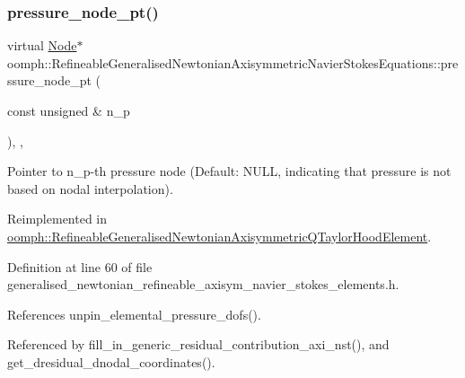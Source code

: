 \subsubsection{\texorpdfstring{pressure\+\_\+node\+\_\+pt()}{pressure\_node\_pt()}}
{\footnotesize\ttfamily virtual \hyperlink{classoomph_1_1Node}{Node}$\ast$ oomph\+::\+Refineable\+Generalised\+Newtonian\+Axisymmetric\+Navier\+Stokes\+Equations\+::pressure\+\_\+node\+\_\+pt (\begin{DoxyParamCaption}\item[{const unsigned \&}]{n\+\_\+p }\end{DoxyParamCaption})\hspace{0.3cm}{\ttfamily [inline]}, {\ttfamily [protected]}, {\ttfamily [virtual]}}



Pointer to n\+\_\+p-\/th pressure node (Default\+: N\+U\+LL, indicating that pressure is not based on nodal interpolation). 



Reimplemented in \hyperlink{classoomph_1_1RefineableGeneralisedNewtonianAxisymmetricQTaylorHoodElement_a323d05f3e4ba28e9e9b503f44cb33eb7}{oomph\+::\+Refineable\+Generalised\+Newtonian\+Axisymmetric\+Q\+Taylor\+Hood\+Element}.



Definition at line 60 of file generalised\+\_\+newtonian\+\_\+refineable\+\_\+axisym\+\_\+navier\+\_\+stokes\+\_\+elements.\+h.



References unpin\+\_\+elemental\+\_\+pressure\+\_\+dofs().



Referenced by fill\+\_\+in\+\_\+generic\+\_\+residual\+\_\+contribution\+\_\+axi\+\_\+nst(), and get\+\_\+dresidual\+\_\+dnodal\+\_\+coordinates().

\mbox{\label{classoomph_1_1RefineableGeneralisedNewtonianAxisymmetricNavierStokesEquations_ad57bc5856bd3c02fd2fdd3844656f2e2}} 
